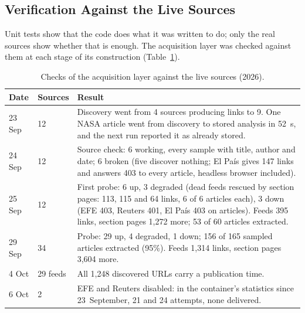 
\subsection{Verification Against the Live Sources}
\label{subsec:scraping-live}

Unit tests show that the code does what it was written to do; only the
real sources show whether that is enough. The acquisition layer was
checked against them at each stage of its construction
(Table~\ref{tab:scraping-live}).

\begin{table}[ht]
\centering
\small
\caption{Checks of the acquisition layer against the live sources
(2026).}
\label{tab:scraping-live}
\begin{tabularx}{\linewidth}{@{}lp{1.5cm}X@{}}
\toprule
Date & Sources & Result \\
\midrule
23 Sep & 12
& Discovery went from 4 sources producing links to 9. One NASA article
  went from discovery to stored analysis in 52~s, and the next run
  reported it as already stored. \\
24 Sep & 12
& Source check: 6 working, every sample with title, author and date;
  6 broken (five discover nothing; El País gives 147 links and answers
  403 to every article, headless browser included). \\
25 Sep & 12
& First probe: 6 up, 3 degraded (dead feeds rescued by section pages:
  113, 115 and 64 links, 6 of 6 articles each), 3 down (EFE 403,
  Reuters 401, El País 403 on articles). Feeds 395 links, section pages
  1,272 more; 53 of 60 articles extracted. \\
29 Sep & 34
& Probe: 29 up, 4 degraded, 1 down; 156 of 165 sampled articles
  extracted (95\%). Feeds 1,314 links, section pages 3,604 more. \\
4 Oct  & 29 feeds
& All 1,248 discovered URLs carry a publication time. \\
6 Oct  & 2
& EFE and Reuters disabled: in the container's statistics since
  23~September, 21 and 24 attempts, none delivered. \\
\bottomrule
\end{tabularx}
\end{table}

